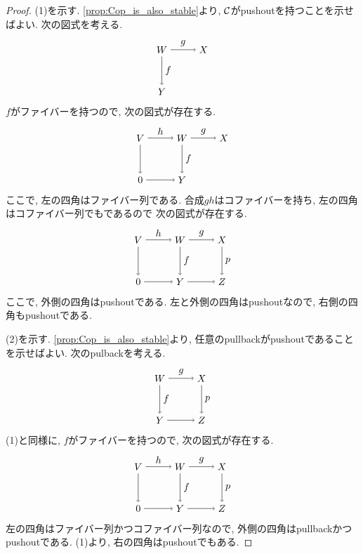 \documentclass[uplatex, a4paper, 14Q, dvipdfmx]{jsarticle}
\begin{document}
\begin{proof}
  (1)を示す.
  \cref{prop:Cop_is_also_stable}より, $\mathcal{C}$がpushoutを持つことを示せばよい.
  次の図式を考える.
  \[
    \begin{tikzpicture}[auto,->]
      \node (Y) at (0,0) {$Y$};
      \node (W) at (0,1.5) {$W$};
      \node (X) at (1.5,1.5) {$X$};
      \draw (W) -- node {$g$} (X);
      \draw (W) -- node {$f$} (Y);
    \end{tikzpicture}
  \]
  $f$がファイバーを持つので, 次の図式が存在する.
  \[
    \begin{tikzpicture}[auto,->]
      \node (V) at (-1.5,1.5) {$V$};
      \node (0) at (-1.5,0) {$0$};
      \node (Y) at (0,0) {$Y$};
      \node (W) at (0,1.5) {$W$};
      \node (X) at (1.5,1.5) {$X$};
      \draw (V) -- node {$h$} (W);
      \draw (V) -- (0);
      \draw (0) -- (Y);
      \draw (W) -- node {$g$} (X);
      \draw (W) -- node {$f$} (Y);
    \end{tikzpicture}
  \]
  ここで, 左の四角はファイバー列である.
  合成$gh$はコファイバーを持ち, 左の四角はコファイバー列でもであるので 次の図式が存在する.
  \[
    \begin{tikzpicture}[auto,->]
      \node (V) at (-1.5,1.5) {$V$};
      \node (0) at (-1.5,0) {$0$};
      \node (Y) at (0,0) {$Y$};
      \node (W) at (0,1.5) {$W$};
      \node (X) at (1.5,1.5) {$X$};
      \node (Z) at (1.5,0) {$Z$};
      \draw (V) -- node {$h$} (W);
      \draw (V) -- (0);
      \draw (0) -- (Y);
      \draw (W) -- node {$g$} (X);
      \draw (W) -- node {$f$} (Y);
      \draw (X) -- node {$p$} (Z);
      \draw (Y) -- (Z);
    \end{tikzpicture}
  \]
  ここで, 外側の四角はpushoutである. 
  左と外側の四角はpushoutなので, 右側の四角もpushoutである. 

  (2)を示す.
  \cref{prop:Cop_is_also_stable}より, 任意のpullbackがpushoutであることを示せばよい.
  次のpulbackを考える. 
  \[
    \begin{tikzpicture}[auto,->]
      \node (Y) at (0,0) {$Y$};
      \node (W) at (0,1.5) {$W$};
      \node (X) at (1.5,1.5) {$X$};
      \node (Z) at (1.5,0) {$Z$};
      \draw (W) -- node {$g$} (X);
      \draw (W) -- node {$f$} (Y);
      \draw (X) -- node {$p$} (Z);
      \draw (Y) -- (Z);
    \end{tikzpicture}
  \]
  (1)と同様に, $f$がファイバーを持つので, 次の図式が存在する.
  \[
    \begin{tikzpicture}[auto,->]
      \node (V) at (-1.5,1.5) {$V$};
      \node (0) at (-1.5,0) {$0$};
      \node (Y) at (0,0) {$Y$};
      \node (W) at (0,1.5) {$W$};
      \node (X) at (1.5,1.5) {$X$};
      \node (Z) at (1.5,0) {$Z$};
      \draw (V) -- node {$h$} (W);
      \draw (V) -- (0);
      \draw (0) -- (Y);
      \draw (W) -- node {$g$} (X);
      \draw (W) -- node {$f$} (Y);
      \draw (X) -- node {$p$} (Z);
      \draw (Y) -- (Z);
    \end{tikzpicture}
  \]
  左の四角はファイバー列かつコファイバー列なので, 外側の四角はpullbackかつpushoutである.
  (1)より, 右の四角はpushoutでもある.
\end{proof}
\end{document}
